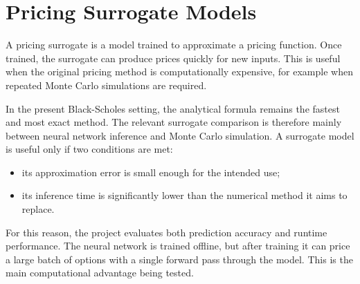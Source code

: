 \section{Pricing Surrogate Models}

A pricing surrogate is a model trained to approximate a pricing function.
Once trained, the surrogate can produce prices quickly for new inputs.
This is useful when the original pricing method is computationally expensive, for example when repeated Monte Carlo simulations are required.

In the present Black-Scholes setting, the analytical formula remains the fastest and most exact method.
The relevant surrogate comparison is therefore mainly between neural network inference and Monte Carlo simulation.
A surrogate model is useful only if two conditions are met:

\begin{itemize}
    \item its approximation error is small enough for the intended use;
    \item its inference time is significantly lower than the numerical method it aims to replace.
\end{itemize}
For this reason, the project evaluates both prediction accuracy and runtime performance.
The neural network is trained offline, but after training it can price a large batch of options with a single forward pass through the model.
This is the main computational advantage being tested.
